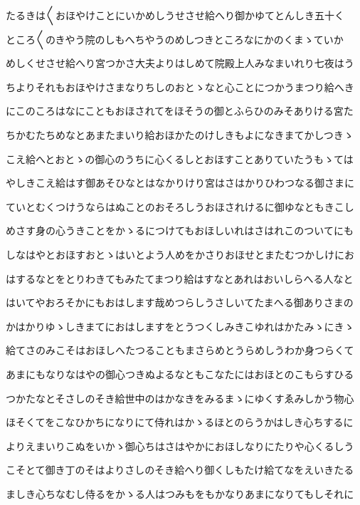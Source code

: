 \documentclass[a4paper,11pt,landscape]{ltjtarticle}
\begin{document}
\par\medskip
たるきは〱おほやけことにいかめしうせさせ給へり御かゆてとんしき五十く
\par\medskip
ところ〱のきやう院のしもへちやうのめしつきところなにかのくまゝていか
\par\medskip
めしくせさせ給へり宮つかさ大夫よりはしめて院殿上人みなまいれり七夜はう
\par\medskip
ちよりそれもおほやけさまなりちしのおとゝなと心ことにつかうまつり給へき
\par\medskip
にこのころはなにこともおほされてをほそうの御とふらひのみそありける宮た
\par\medskip
ちかむたちめなとあまたまいり給おほかたのけしきもよになきまてかしつきゝ
\par\medskip
こえ給へとおとゝの御心のうちに心くるしとおほすことありていたうもゝては
\par\medskip
やしきこえ給はす御あそひなとはなかりけり宮はさはかりひわつなる御さまに
\par\medskip
ていとむくつけうならはぬことのおそろしうおほされけるに御ゆなともきこし
\par\medskip
めさす身の心うきことをかゝるにつけてもおほしいれはさはれこのついてにも
\par\medskip
しなはやとおほすおとゝはいとよう人めをかさりおほせとまたむつかしけにお
\par\medskip
はするなとをとりわきてもみたてまつり給はすなとあれはおいしらへる人なと
\par\medskip
はいてやおろそかにもおはします哉めつらしうさしいてたまへる御ありさまの
\par\medskip
かはかりゆゝしきまてにおはしますをとうつくしみきこゆれはかたみゝにきゝ
\par\medskip
給てさのみこそはおほしへたつることもまさらめとうらめしうわか身つらくて
\par\medskip
あまにもなりなはやの御心つきぬよるなともこなたにはおほとのこもらすひる
\par\medskip
つかたなとそさしのそき給世中のはかなきをみるまゝにゆくすゑみしかう物心
\par\medskip
ほそくてをこなひかちになりにて侍れはかゝるほとのらうかはしき心ちするに
\par\medskip
よりえまいりこぬをいかゝ御心ちはさはやかにおほしなりにたりや心くるしう
\par\medskip
こそとて御き丁のそはよりさしのそき給へり御くしもたけ給てなをえいきたる
\par\medskip
ましき心ちなむし侍るをかゝる人はつみもをもかなりあまになりてもしそれに
\end{document}
